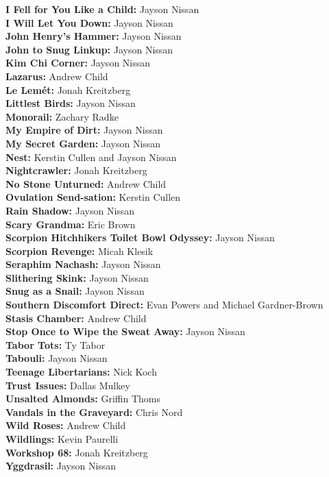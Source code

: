 \begin{flushleft}
\textbf{I Fell for You Like a Child:} Jayson Nissan\\
\textbf{I Will Let You Down:} Jayson Nissan\\
\textbf{John Henry's Hammer:} Jayson Nissan\\
\textbf{John to Snug Linkup:} Jayson Nissan\\
\textbf{Kim Chi Corner:} Jayson Nissan\\
\textbf{Lazarus:} Andrew Child\\
\textbf{Le Lemét:} Jonah Kreitzberg\\
\textbf{Littlest Birds:} Jayson Nissan\\
\textbf{Monorail:} Zachary Radke\\
\textbf{My Empire of Dirt:} Jayson Nissan\\
\textbf{My Secret Garden:} Jayson Nissan\\
\textbf{Nest:} Kerstin Cullen and Jayson Nissan\\
\textbf{Nightcrawler:} Jonah Kreitzberg\\
\textbf{No Stone Unturned:} Andrew Child\\
\textbf{Ovulation Send-sation:} Kerstin Cullen\\
\textbf{Rain Shadow:} Jayson Nissan\\
\textbf{Scary Grandma:} Eric Brown\\
\textbf{Scorpion Hitchhikers Toilet Bowl Odyssey:} Jayson Nissan\\
\textbf{Scorpion Revenge:} Micah Klesik\\
\textbf{Seraphim Nachash:} Jayson Nissan\\
\textbf{Slithering Skink:} Jayson Nissan\\
\textbf{Snug as a Snail:} Jayson Nissan\\
\textbf{Southern Discomfort Direct:} Evan Powers and Michael Gardner-Brown\\
\textbf{Stasis Chamber:} Andrew Child\\
\textbf{Stop Once to Wipe the Sweat Away:} Jayson Nissan\\
\textbf{Tabor Tots:} Ty Tabor\\
\textbf{Tabouli:} Jayson Nissan\\
\textbf{Teenage Libertarians:} Nick Koch\\
\textbf{Trust Issues:} Dallas Mulkey\\
\textbf{Unsalted Almonds:} Griffin Thoms\\
\textbf{Vandals in the Graveyard:} Chris Nord\\
\textbf{Wild Roses:} Andrew Child\\
\textbf{Wildlings:} Kevin Paurelli\\
\textbf{Workshop 68:} Jonah Kreitzberg\\
\textbf{Yggdrasil:} Jayson Nissan\\
\end{flushleft}
\onecolumn
\clearpage